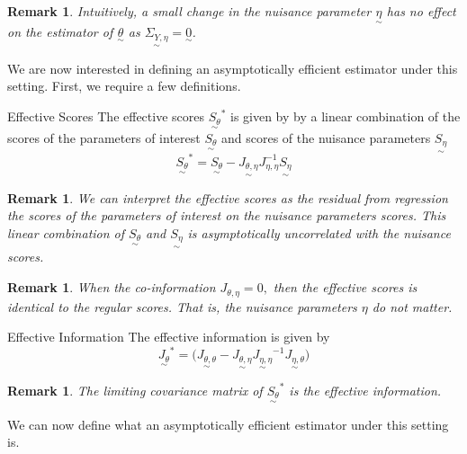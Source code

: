 \documentclass[twoside]{article}
\newtheorem{remark}[theorem]{Remark}
\newcommand{\utilde}{\underset{\sim}}
\begin{document}
\begin{remark}
Intuitively, a small change in the nuisance parameter $\utilde{\eta}$ has no effect on the estimator of $\utilde{\theta}$ as  $\utilde{\Sigma_{Y, \eta}} = \utilde{0}$.
\end{remark}

We are now interested in defining an asymptotically efficient estimator under this setting. First, we require a few definitions.

\begin{definition_exam}{Effective Scores}{} The effective scores $\utilde{S_{\theta}}^{*}$ is given by by a linear combination of the scores of the parameters of interest $\utilde{S_{\theta}}$ and scores of the nuisance parameters $\utilde{S_{\eta}}$
\begin{equation}
\utilde{S_{\theta}}^{*} = \utilde{S_{\theta}} - \utilde{J_{\theta, \eta}}J_{\eta, \eta}^{-1}\utilde{S_{\eta}}
\end{equation}
\end{definition_exam}
\begin{remark} We can interpret the effective scores as the residual from regression the scores of the parameters of interest on the nuisance parameters scores. This linear combination of $\utilde{S_{\theta}}$ and $\utilde{S_{\eta}}$ is asymptotically uncorrelated with the nuisance scores.
\end{remark}
\begin{remark} When the co-information $J_{\theta, \eta} = 0,$ then the effective scores is identical to the regular scores. That is, the nuisance parameters $\eta$ do not matter.
\end{remark}

\begin{definition_exam}{Effective Information}{} The effective information is given by 
\begin{equation}
\utilde{J_{\theta}}^{*} = \bigg(\utilde{J_{\theta, \theta}} - \utilde{J_{\theta, \eta}}\utilde{J_{\eta, \eta}}^{-1}\utilde{J_{\eta, \theta}}\bigg)
\end{equation}
\end{definition_exam}

\begin{remark} The limiting covariance matrix of $\utilde{S_{\theta}}^{*}$ is the effective information.
\end{remark}

We can now define what an asymptotically efficient estimator under this setting is.
\end{document}
